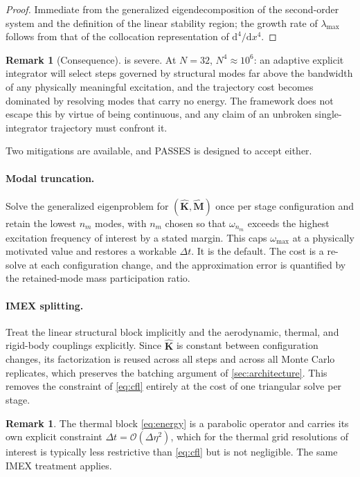 \documentclass[11pt,a4paper]{article}
\theoremstyle{definition}
\newtheorem{remark}[theorem]{Remark}
\numberwithin{equation}{section}
\newcommand{\diff}{\mathrm{d}}
\begin{document}
\begin{proof}
Immediate from the generalized eigendecomposition of the second-order system and the definition of the linear stability region; the growth rate of $\lambda_{\max}$ follows from that of the collocation representation of $\diff^4/\diff x^4$.
\end{proof}

\begin{remark}[Consequence]
\label{rem:consequence}
 is severe. At $N = 32$, $N^4 \approx 10^6$: an adaptive explicit integrator will select steps governed by structural modes far above the bandwidth of any physically meaningful excitation, and the trajectory cost becomes dominated by resolving modes that carry no energy. The framework does not escape this by virtue of being continuous, and any claim of an unbroken single-integrator trajectory must confront it.
\end{remark}

Two mitigations are available, and PASSES is designed to accept either.

\paragraph{Modal truncation.} Solve the generalized eigenproblem for $(\hat{\mathbf{K}}, \hat{\mathbf{M}})$ once per stage configuration and retain the lowest $n_m$ modes, with $n_m$ chosen so that $\omega_{n_m}$ exceeds the highest excitation frequency of interest by a stated margin. This caps $\omega_{\max}$ at a physically motivated value and restores a workable $\Delta t$. It is the default. The cost is a re-solve at each configuration change, and the approximation error is quantified by the retained-mode mass participation ratio.

\paragraph{IMEX splitting.} Treat the linear structural block implicitly and the aerodynamic, thermal, and rigid-body couplings explicitly. Since $\hat{\mathbf{K}}$ is constant between configuration changes, its factorization is reused across all steps and across all Monte Carlo replicates, which preserves the batching argument of \cref{sec:architecture}. This removes the constraint of \cref{eq:cfl} entirely at the cost of one triangular solve per stage.

\begin{remark}
The thermal block \cref{eq:energy} is a parabolic operator and carries its own explicit constraint $\Delta t = \mathcal{O}(\Delta \eta^2)$, which for the thermal grid resolutions of interest is typically less restrictive than \cref{eq:cfl} but is not negligible. The same IMEX treatment applies.
\end{remark}
\end{document}
